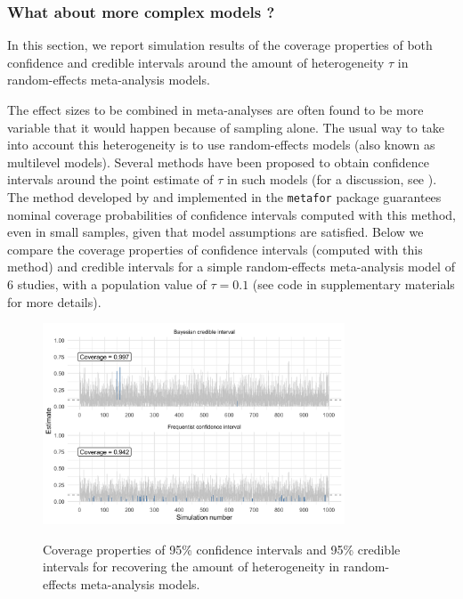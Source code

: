 \documentclass[a4paper,man,natbib,floatsintext,donotrepeattitle]{apa6}
\begin{document}
\subsubsection{What about more complex models ?}

In this section, we report simulation results of the coverage properties of both confidence and credible intervals around the amount of heterogeneity $\tau$ in random-effects meta-analysis models.

The effect sizes to be combined in meta-analyses are often found to be more variable that it would happen because of sampling alone. The usual way to take into account this heterogeneity is to use random-effects models (also known as multilevel models). Several methods have been proposed to obtain confidence intervals around the point estimate of $\tau$ in such models (for a discussion, see \citealp{williams_bayesian_2018}). The method developed by \cite{paule_consensus_1982} and implemented in the \texttt{metafor} package \citep{viechtbauer_conducting_2010} guarantees nominal coverage probabilities of confidence intervals computed with this method, even in small samples, given that model assumptions are satisfied. Below we compare the coverage properties of confidence intervals (computed with this method) and credible intervals for a simple random-effects meta-analysis model of 6 studies, with a population value of $\tau = 0.1$ (see code in supplementary materials for more details).

\begin{figure}[H]
  \caption{Coverage properties of 95\% confidence intervals and 95\% credible intervals for recovering the amount of heterogeneity in random-effects meta-analysis models.}
  \centering
  \includegraphics[width=0.8\textwidth]{coverage2.png}
  \label{fig:coverage2}
\end{figure}
\end{document}

